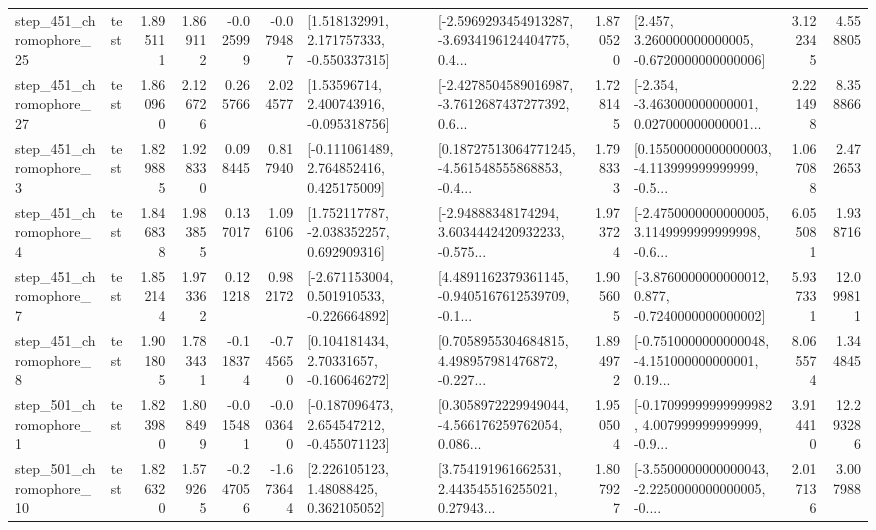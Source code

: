 \begin{tabular}{llrrrrllrlrr}
  step\_451\_chromophore\_25 &      test &      1.895111 &    1.869112 &     -0.025999 & -0.079487 &    [1.518132991, 2.171757333, -0.550337315] &  [-2.5969293454913287, -3.6934196124404775, 0.4... &       1.870520 &    [2.457, 3.260000000000005, -0.6720000000000006] &            3.122345 &          4.558805 \\
  step\_451\_chromophore\_27 &      test &      1.860960 &    2.126726 &      0.265766 &  2.024577 &     [1.53596714, 2.400743916, -0.095318756] &  [-2.4278504589016987, -3.7612687437277392, 0.6... &       1.728145 &  [-2.354, -3.463000000000001, 0.027000000000001... &            2.221498 &          8.358866 \\
   step\_451\_chromophore\_3 &      test &      1.829885 &    1.928330 &      0.098445 &  0.817940 &    [-0.111061489, 2.764852416, 0.425175009] &  [0.18727513064771245, -4.561548555868853, -0.4... &       1.798333 &  [0.15500000000000003, -4.113999999999999, -0.5... &            1.067088 &          2.472653 \\
   step\_451\_chromophore\_4 &      test &      1.846838 &    1.983855 &      0.137017 &  1.096106 &    [1.752117787, -2.038352257, 0.692909316] &  [-2.94888348174294, 3.6034442420932233, -0.575... &       1.973724 &  [-2.4750000000000005, 3.1149999999999998, -0.6... &            6.055081 &          1.938716 \\
   step\_451\_chromophore\_7 &      test &      1.852144 &    1.973362 &      0.121218 &  0.982172 &   [-2.671153004, 0.501910533, -0.226664892] &  [4.4891162379361145, -0.9405167612539709, -0.1... &       1.905605 &  [-3.8760000000000012, 0.877, -0.7240000000000002] &            5.937331 &         12.099811 \\
   step\_451\_chromophore\_8 &      test &      1.901805 &    1.783431 &     -0.118374 & -0.745650 &     [0.104181434, 2.70331657, -0.160646272] &  [0.7058955304684815, 4.498957981476872, -0.227... &       1.894972 &  [-0.7510000000000048, -4.151000000000001, 0.19... &            8.065574 &          1.344845 \\
   step\_501\_chromophore\_1 &      test &      1.823980 &    1.808499 &     -0.015481 & -0.003640 &   [-0.187096473, 2.654547212, -0.455071123] &  [0.3058972229949044, -4.566176259762054, 0.086... &       1.950504 &  [-0.17099999999999982, 4.007999999999999, -0.9... &            3.914410 &         12.293286 \\
  step\_501\_chromophore\_10 &      test &      1.826320 &    1.579265 &     -0.247056 & -1.673644 &      [2.226105123, 1.48088425, 0.362105052] &  [3.754191961662531, 2.443545516255021, 0.27943... &       1.807927 &  [-3.5500000000000043, -2.2250000000000005, -0.... &            2.017136 &          3.007988 \\

\end{tabular}

